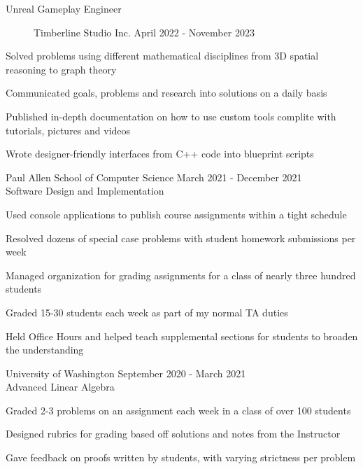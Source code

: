 \documentclass[10pt]{article}
\newenvironment{itemize*}
{\begin{itemize}[leftmargin=*]
    \setlength{\parskip}{0.5pt}}
{\end{itemize}}
\begin{document}
\begin{description}
\item[Unreal Gameplay Engineer] Timberline Studio Inc.
    \hfill April 2022 - November 2023
\end{description}
\begin{itemize*}
\item Solved problems using different mathematical disciplines from 3D spatial reasoning to graph theory
\item Communicated goals, problems and research into solutions on a daily basis
\item Published in-depth documentation on how to use custom tools complite with tutorials, pictures and videos
\item Wrote designer-friendly interfaces from C++ code into blueprint scripts
\end{itemize*}
\vspace{10pt}

\begin{description}[leftmargin=!,
                    labelwidth=\widthof{\bfseries Teaching Assistant}]

\item[Teaching Assistant] Paul Allen School of Computer Science \hfill 
    March 2021 - December 2021\\
    Software Design and Implementation
\end{description}
\begin{itemize*}
\item Used console applications to publish course assignments within a tight schedule
\item Resolved dozens of special case problems with student homework submissions per week
\item Managed organization for grading assignments for a class of nearly three hundred students
\item Graded 15-30 students each week as part of my normal TA duties
\item Held Office Hours and helped teach supplemental sections for students to
    broaden the understanding
\end{itemize*}
\vspace{10pt}

\begin{description}[leftmargin=!,
                    labelwidth=\widthof{\bfseries Grader}]
\item[Grader] University of Washington \hfill
    September 2020 - March 2021\\
    Advanced Linear Algebra
\end{description}
\begin{itemize*}
\item Graded 2-3 problems on an assignment each week in a class of over 100 students
\item Designed rubrics for grading based off solutions and notes from the Instructor
\item Gave feedback on proofs written by students, with varying strictness per problem
\end{itemize*}
\vspace{10pt}
\end{document}
